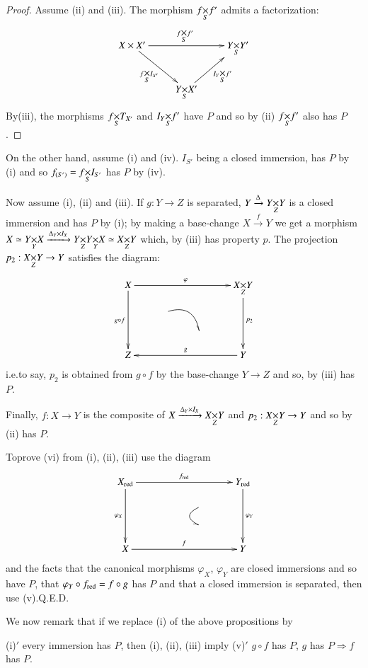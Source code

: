 \begin{proof}
Assume (ii) and (iii). The morphism $\fprod{f}{f'}{S}$ admits a
factorization: 
\[
\xymatrix{
X\times X'\ar[dr]_{\fprod{f}{I_{X'}}{S}}\ar[rr]^{\fprod{f}{f'}{S}} & &
    \fprod{Y}{Y'}{S}\\
 & \fprod{Y}{X'}{S}\ar[ur]_{\fprod{I_{Y}}{f'}{S}} &
}
\]
By\pageoriginale (iii), the morphisms $\fprod{f}{T_{X'}}{S}$ and
$\fprod{I_{Y}}{f'}{S}$ have $P$ and so by (ii) $\fprod{f}{f'}{S}$ also
has $P$.
\end{proof}

On the other hand, assume (i) and (iv). $I_{S'}$ being a closed
immersion, has $P$ by (i) and so $f_{(S')}=\fprod{f}{I_{S'}}{S}$ has
$P$ by (iv).

Now assume (i), (ii) and (iii). If $g:Y\to Z$ is separated,
$\fprod{Y\xrightarrow{\Delta}{Y}}{Y}{Z}$ is a closed immersion and has
$P$ by (i); by making a base-change $X\xrightarrow{f}Y$ we get a
morphism $X\simeq \fprod{Y}{X}{Y}\xrightarrow{\Delta_{Y}\times
  I_{X}}\fprod{\fprod{Y}{Y}{Z}}{X}{Y}\simeq \fprod{X}{Y}{Z}$ which, by
(iii) has property $p$. The projection $p_{2}:\fprod{X}{Y}{Z}\to Y$
satisfies the diagram:
\[
\xymatrix@R=.5cm@C=1cm{
X\ar[rrr]^{\varphi}\ar[ddd]_{g\circ f} & & & \fprod{X}{Y}{Z}\ar[ddd]^{p_{2}}\\
 & \ar@/^1pc/@{-_{>}}[dr] & & \\
 & & & \\
Z\ar@{<-}[rrr]^{g} & & & Y
}
\]
i.e.\@ to say, $p_{2}$ is obtained from $g\circ f$ by the base-change
$Y\to Z$ and so, by (iii) has $P$.

Finally, $f:X\to Y$ is the composite of
$X\xrightarrow{\Delta_{Y}\times I_{X}}\fprod{X}{Y}{Z}$ and
$p_{2}:\fprod{X}{Y}{Z}\to Y$ and so by (ii) has $P$.

To\pageoriginale prove (vi) from  (i), (ii), (iii) use the diagram
\[
\xymatrix@R=.5cm@C=1cm{
X_{\red}\ar[rrr]^{f_{\red}}\ar[ddd]_{\varphi_{X}} & & & Y_{\red}\ar[ddd]^{\varphi_{Y}}\\
 &  & \ar@/_1pc/@{-_{>}}[dlr] & \\
 & & & \\
X\ar[rrr]^{f} & & & Y
}
\]
and the facts that the canonical morphisms $\varphi_{X}$,
$\varphi_{Y}$ are closed immersions and so have $P$, that
$\varphi_{Y}\circ f_{\operatorname{red}}=f\circ g$ has $P$ and that a closed
immersion is separated, then use (v).\hfill Q.E.D.

We now remark that if we replace (i) of the above propositions by

(i)$'$ every immersion has $P$,
then (i), (ii), (iii) imply (v)$'$ $g\circ f$ has $P$, $g$ has
$P\Rightarrow f$ has $P$.

